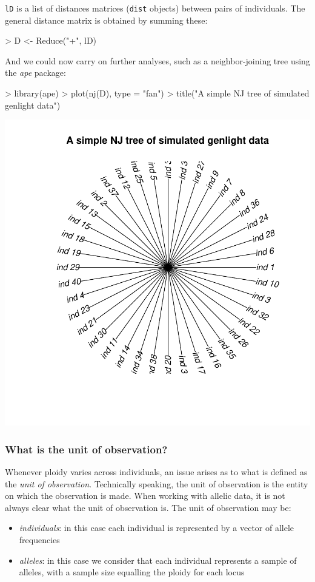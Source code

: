 \documentclass{article}
\begin{document}
\texttt{lD} is a list of distances matrices (\texttt{dist} objects) between pairs of individuals.
The general distance matrix is obtained by summing these:
\begin{Schunk}
\begin{Sinput}
> D <- Reduce("+", lD)
\end{Sinput}
\end{Schunk}
And we could now carry on further analyses, such as a neighbor-joining tree using the \textit{ape} package:
\begin{Schunk}
\begin{Sinput}
> library(ape)
> plot(nj(D), type = "fan")
> title("A simple NJ tree of simulated genlight data")
\end{Sinput}
\end{Schunk}
\includegraphics{figs/genomics-044}




\subsubsection{What is the unit of observation?}
Whenever ploidy varies across individuals, an issue arises as to what is defined as the \textit{unit of observation}.
Technically speaking, the unit of observation is the entity on which the observation is made.
When working with allelic data, it is not always clear what the unit of observation is.
The unit of observation may be:
\begin{itemize}
  \item \textit{individuals}: in this case each individual is represented by a vector of allele frequencies
  \item \textit{alleles}: in this case we consider that each individual represents a sample of
    alleles, with a sample size equalling the ploidy for each locus
\end{itemize}
\end{document}
